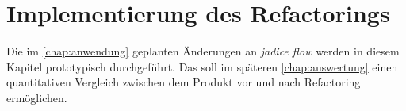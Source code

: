 \chapter{Implementierung des Refactorings}
\label{chap:implementierung}

Die im \cref{chap:anwendung} geplanten Änderungen an \emph{jadice flow} werden in diesem Kapitel prototypisch durchgeführt.
Das soll im späteren \cref{chap:auswertung} einen quantitativen Vergleich zwischen dem Produkt vor und nach Refactoring ermöglichen.
